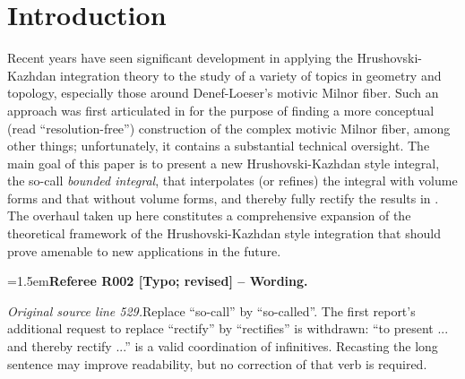 \documentclass[12pt]{amsart}
\newcommand{\RefereeRemark}[4]{%
  \par\medskip\begingroup\normalfont\small\color{RefereePurple}%
  \emergencystretch=1.5em\noindent\textbf{Referee R#1 [#2] -- #3.}\par\nobreak\noindent #4\par
  \endgroup\medskip
}
\newcommand{\memph}[1]{{\color{magenta}\emph{#1}}}
\theoremstyle{plain}
\theoremstyle{definition}
\theoremstyle{remark}
\numberwithin{equation}{section}
\theoremstyle{plain}
\newcommand{\0}{\emptyset}
\begin{document}
\section{Introduction}
Recent years have seen significant development in applying the Hrushovski-Kazhdan integration theory to the  study of a variety of topics in geometry and topology, especially those around Denef-Loeser's motivic Milnor fiber. Such an approach  was first articulated in  \cite{hru:loe:lef} for the purpose of  finding a more conceptual (read ``resolution-free'') construction of the complex  motivic Milnor fiber, among other things; unfortunately, it contains a substantial technical oversight. The main goal of this paper is to present a new Hrushovski-Kazhdan style integral,  the so-call \memph{bounded integral}, that interpolates (or refines) the integral with volume forms and that without volume forms, and thereby fully rectify the results in  \cite{hru:loe:lef}.
The overhaul taken up here constitutes a comprehensive expansion of the theoretical framework of the Hrushovski-Kazhdan style integration that should prove amenable to new applications in the future.

\RefereeRemark{002}{Typo; revised}{Wording}{%
\textit{Original source line 529.}\quad Replace ``so-call'' by ``so-called''. The first report's additional request to replace ``rectify'' by ``rectifies'' is withdrawn: ``to present ... and thereby rectify ...'' is a valid coordination of infinitives. Recasting the long sentence may improve readability, but no correction of that verb is required.
}
\end{document}
